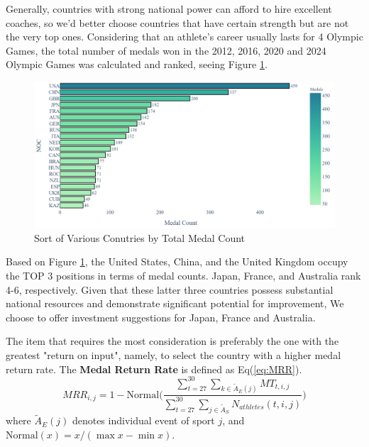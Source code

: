 \documentclass{mcmthesis}
\begin{document}
	Generally, countries with strong national power can afford to hire excellent coaches, so we'd better choose countries that have certain strength but are not the very top ones. Considering that an athlete's career usually lasts for 4 Olympic Games, the total number of medals won in the 2012, 2016, 2020 and 2024 Olympic Games was calculated and ranked, seeing Figure \ref{fig:medal_count_by_noc}.
	
	\begin{figure}[H]
		\centering
		\includegraphics[width=1\linewidth]{fig/Medal_Count_by_NOC.png}
		\caption{Sort of Various Conutries by Total Medal Count}
		\label{fig:medal_count_by_noc}
	\end{figure}
	
	
	Based on Figure \ref{fig:medal_count_by_noc}, the United States, China, and the United Kingdom occupy the TOP 3 positions in terms of medal counts. Japan, France, and Australia rank 4-6, respectively. Given that these latter three countries possess substantial national resources and demonstrate significant potential for improvement, We choose to offer investment suggestions for Japan, France and Australia.
	
	
	
	The item that requires the most consideration is preferably the one with the greatest "return on input", namely, to select the country with a higher medal return rate. The \textbf{Medal Return Rate} is defined as Eq(\ref{eq:MRR}).
	\begin{equation}
		MRR_{i,j}=1-\text{Normal}
		\Bigg( 
		\frac{ \sum_{t=27}^{30} \sum_{k\in \tilde{A}_{E}(j)} MT_{t,i,j} }{ \sum_{t=27}^{30} \sum_{j\in \tilde{A}_{S}} N_{athletes}(t,i,j) }
		\Bigg)
		\label{eq:MRR}
	\end{equation}
	where $\tilde{A}_{E}(j)$ denotes individual event of sport $j$, and $\text{Normal}(x)=x/(\max{x} - \min{x})$. 
	
\end{document}
